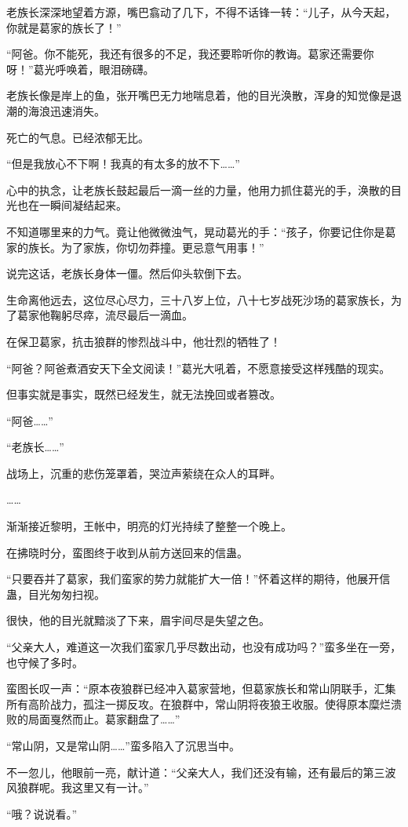 \begin{this_body}
老族长深深地望着方源，嘴巴翕动了几下，不得不话锋一转：“儿子，从今天起，你就是葛家的族长了！”

“阿爸。你不能死，我还有很多的不足，我还要聆听你的教诲。葛家还需要你呀！”葛光呼唤着，眼泪磅礴。

老族长像是岸上的鱼，张开嘴巴无力地喘息着，他的目光涣散，浑身的知觉像是退潮的海浪迅速消失。

死亡的气息。已经浓郁无比。

“但是我放心不下啊！我真的有太多的放不下……”

心中的执念，让老族长鼓起最后一滴一丝的力量，他用力抓住葛光的手，涣散的目光也在一瞬间凝结起来。

不知道哪里来的力气。竟让他微微浊气，晃动葛光的手：“孩子，你要记住你是葛家的族长。为了家族，你切勿莽撞。更忌意气用事！”

说完这话，老族长身体一僵。然后仰头软倒下去。

生命离他远去，这位尽心尽力，三十八岁上位，八十七岁战死沙场的葛家族长，为了葛家他鞠躬尽瘁，流尽最后一滴血。

在保卫葛家，抗击狼群的惨烈战斗中，他壮烈的牺牲了！

“阿爸？阿爸煮酒安天下全文阅读！”葛光大吼着，不愿意接受这样残酷的现实。

但事实就是事实，既然已经发生，就无法挽回或者篡改。

“阿爸……”

“老族长……”

战场上，沉重的悲伤笼罩着，哭泣声萦绕在众人的耳畔。

……

渐渐接近黎明，王帐中，明亮的灯光持续了整整一个晚上。

在拂晓时分，蛮图终于收到从前方送回来的信蛊。

“只要吞并了葛家，我们蛮家的势力就能扩大一倍！”怀着这样的期待，他展开信蛊，目光匆匆扫视。

很快，他的目光就黯淡了下来，眉宇间尽是失望之色。

“父亲大人，难道这一次我们蛮家几乎尽数出动，也没有成功吗？”蛮多坐在一旁，也守候了多时。

蛮图长叹一声：“原本夜狼群已经冲入葛家营地，但葛家族长和常山阴联手，汇集所有高阶战力，孤注一掷反攻。在狼群中，常山阴将夜狼王收服。使得原本糜烂溃败的局面戛然而止。葛家翻盘了……”

“常山阴，又是常山阴……”蛮多陷入了沉思当中。

不一忽儿，他眼前一亮，献计道：“父亲大人，我们还没有输，还有最后的第三波风狼群呢。我这里又有一计。”

“哦？说说看。”


\end{this_body}
